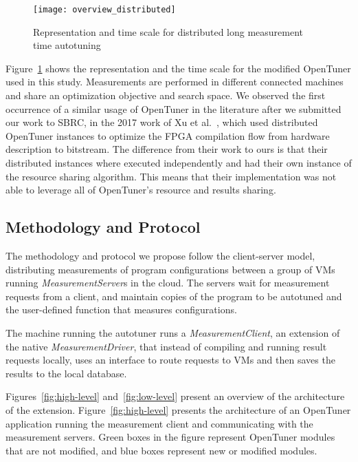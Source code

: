 \begin{figure}[htpb]
    \centering
    \texttt{[image: overview\_distributed]}
    \caption{Representation and time scale for distributed long
    measurement time autotuning}
    \label{fig:overview-distributed}
\end{figure}

Figure~\ref{fig:overview-distributed} shows the representation and the time
scale for the modified OpenTuner used in this study. Measurements are performed
in different connected machines and share an optimization objective and search
space. We observed the first occurrence of a similar usage of OpenTuner in the
literature after we submitted our work to SBRC, in the 2017 work of Xu et
al.~\cite{xu2017parallel}, which used distributed OpenTuner instances to
optimize the FPGA compilation flow from hardware description to bitstream. The
difference from their work to ours is that their distributed instances where
executed independently and had their own instance of the resource sharing
algorithm. This means that their implementation was not able to leverage all of
OpenTuner's resource and results sharing.

\subsection{Methodology and Protocol}
\label{sec:ext}

The methodology and protocol we propose follow the client-server model,
distributing measurements of program configurations between a group of VMs
running \emph{MeasurementServer}s in the cloud. The servers wait for
measurement requests from a client, and maintain copies of the program to be
autotuned and the user-defined function that measures configurations.

The machine running the autotuner runs a \emph{MeasurementClient}, an
extension of the native \emph{MeasurementDriver}, that instead of compiling and
running result requests locally, uses an interface to route requests to VMs and
then saves the results to the local database.

Figures~\ref{fig:high-level} and~\ref{fig:low-level} present an overview of the
architecture of the extension.  Figure~\ref{fig:high-level} presents the
architecture of an OpenTuner application running the measurement client and
communicating with the measurement servers.  Green boxes in the figure
represent OpenTuner modules that are not modified, and blue boxes represent new
or modified modules.

